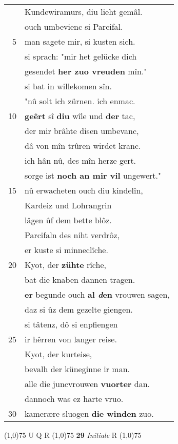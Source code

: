 \documentclass[8pt,a4paper,notitlepage]{article}
\begin{document}
\begin{table}[ht]
\begin{minipage}[t]{0.5\linewidth}
\begin{tabular}{rl}
 & Kundewiramurs, diu lieht gemâl.\\ 
 & ouch umbevienc si Parcifal.\\ 
5 & man sagete mir, si kusten sich.\\ 
 & si sprach: "mir het gelücke dich\\ 
 & gesendet \textbf{her zuo vreuden} mîn."\\ 
 & si bat in willekomen sîn.\\ 
 & "nû solt ich zürnen. ich enmac.\\ 
10 & \textbf{geêrt} sî \textbf{diu} wîle und \textbf{der} tac,\\ 
 & der mir brâhte disen umbevanc,\\ 
 & dâ von mîn trûren wirdet kranc.\\ 
 & ich hân nû, des mîn herze gert.\\ 
 & sorge ist \textbf{noch an mir vil} ungewert."\\ 
15 & nû erwacheten ouch diu kindelîn,\\ 
 & Kardeiz und Lohrangrin\\ 
 & lâgen ûf dem bette blôz.\\ 
 & Parcifaln des niht verdrôz,\\ 
 & er kuste si minneclîche.\\ 
20 & Kyot, der \textbf{zühte} rîche,\\ 
 & bat die knaben dannen tragen.\\ 
 & \textbf{er} begunde ouch \textbf{al \textit{d}en} vrouwen sagen,\\ 
 & daz si ûz dem gezelte giengen.\\ 
 & si tâtenz, dô si enpfiengen\\ 
25 & ir hêrren von langer reise.\\ 
 & Kyot, der kurteise,\\ 
 & bevalh der küneginne ir man.\\ 
 & alle die juncvrouwen \textbf{vuorter} dan.\\ 
 & dannoch was ez harte vruo.\\ 
30 & kamerære sluogen \textbf{die winden} zuo.\\ 
\end{tabular}
\scriptsize
\line(1,0){75} \newline
U Q R \newline
\line(1,0){75} \newline
\textbf{29} \textit{Initiale} R  \newline
\line(1,0){75} \newline

\end{minipage}
\end{table}
\end{document}
